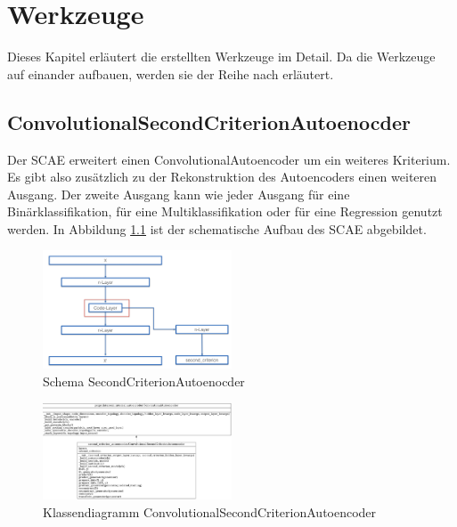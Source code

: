 \listoftodos


\chapter{Werkzeuge}
\label{chap:Werkzeuge}
Dieses Kapitel erläutert die erstellten Werkzeuge im Detail. Da die Werkzeuge auf einander aufbauen, werden sie der Reihe nach erläutert. 

	\section{ConvolutionalSecondCriterionAutoenocder}
	\label{sec:SecondCriterionAutoenocder}
	Der SCAE erweitert einen ConvolutionalAutoencoder um ein weiteres Kriterium. Es gibt also zusätzlich zu der Rekonstruktion des Autoencoders einen weiteren Ausgang. Der zweite Ausgang kann wie jeder Ausgang für eine Binärklassifikation, für eine Multiklassifikation oder für eine Regression genutzt werden. In Abbildung \ref{img:SchemaSCAE} ist der schematische Aufbau des SCAE abgebildet. 
	
				
		\begin{figure}[h]
			\centering
			\includegraphics[width=0.5\textwidth, center]{bilder/Schema_Autoencoders/Schema_SCAE.png}
			\caption[Schema SecondCriterionAutoenocder]{Schema SecondCriterionAutoenocder}
			\label{img:SchemaSCAE}
		\end{figure}  
		
		
		\begin{figure}[h]
			\centering
			\includegraphics[width=0.5\textwidth, center]{bilder/Klassendiagramme/Klassendiagramm_CSCAE.png}
			\caption[Klassendiagramm ConvolutionalSecondCriterionAutoencoder]{Klassendiagramm ConvolutionalSecondCriterionAutoencoder}
			\label{img:KlassendiagrammCSCAE}
		\end{figure}  
		


